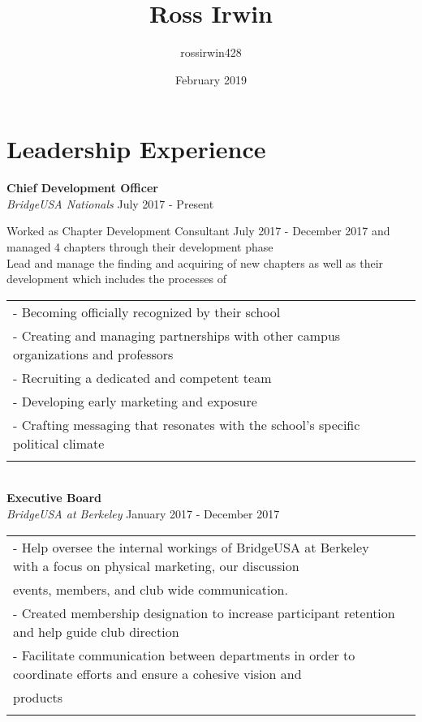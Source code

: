 \documentclass{article}
\title{Ross Irwin}
\author{rossirwin428 }
\date{February 2019}
\begin{document}
\begin{center}
\textheight=10000pt
\large
\textbf{}
\address{\\LinkedIn: www.linkedin.com/in/rossirwin428}
\address{\\Email: rossirwin428@berkeley.edu \\www.bridgeusa.com       209.352.0824\\}
\end{center}
\section*{Leadership Experience}
\begin{flushleft}
\textbf{Chief Development Officer}   \\
\textit{BridgeUSA Nationals}
\hfill
July 2017 - Present 

Worked as Chapter Development Consultant July 2017 - December 2017 and managed 4 chapters through their development phase
\\
Lead and manage the finding and acquiring of new chapters as well as their development which includes the processes of \\
\begin{tabular}{l c}
 - Becoming officially recognized by their school \\
 - Creating and managing partnerships with other campus organizations and professors \\
 - Recruiting a dedicated and competent team \\
 - Developing early marketing and exposure \\
 - Crafting messaging that resonates with the school's specific political climate      \\     \\                  
 \end{tabular} \\

\textbf{Executive Board} \\
\textit{BridgeUSA at Berkeley}
\hfill
January 2017 - December 2017 
\begin{tabular}{l c}
- Help oversee the internal workings of BridgeUSA at Berkeley with a focus on physical marketing, our discussion \\ events,
members, and club wide communication. \\

- Created membership designation to increase participant retention and help guide club direction \\

- Facilitate communication between departments in order to coordinate efforts and ensure a cohesive vision and \\  products \\ \\
\end{tabular} \\
\end{flushleft}
\end{document}
